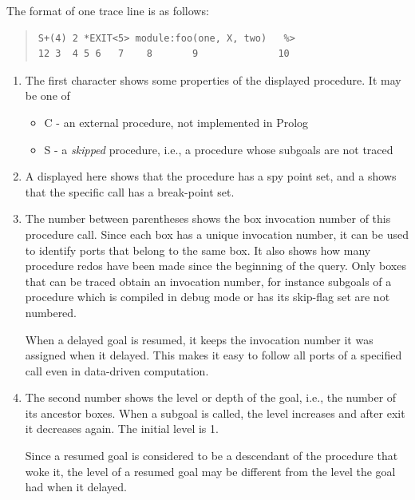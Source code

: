 The format of one trace line is as follows:
\begin{quote}
\begin{verbatim}
S+(4) 2 *EXIT<5> module:foo(one, X, two)   %>
12 3  4 5 6   7    8       9              10
\end{verbatim}
\end{quote}

\begin{enumerate}
\item The first character shows some properties of the
displayed procedure.
It may be one of
\begin{itemize}
\item C - an external procedure, not implemented in Prolog
\item S - a \emph{skipped} procedure, i.e., a procedure whose
subgoals are not traced
\end{itemize}

\item A \notation{+} displayed here shows that the procedure has a spy point
  set,
  and a \notation{\#} shows that the specific call has a break-point set.

\item The number between parentheses shows the box invocation number
of this procedure call.  Since each box has a unique invocation
number, it can be used to identify ports that belong to the same box.
It also shows how many procedure redos have been made since the
beginning of the query.  Only boxes that can be traced obtain an
invocation number, for instance subgoals of a procedure which is
compiled in debug mode or has its skip-flag set are not numbered.

When a delayed goal is resumed, it keeps the invocation number it was
assigned when it delayed.  This makes it easy to follow all ports of a
specified call even in data-driven computation.

\item The second number shows the level or depth of the goal,
i.e., the number of its ancestor boxes.  When a subgoal is called, the
level increases and after exit it decreases again.  The initial level
is 1.

Since a resumed goal is considered to be a descendant of the procedure
that woke it, the level of a resumed goal may be different from
the level the goal had when it delayed.


\end{enumerate}
